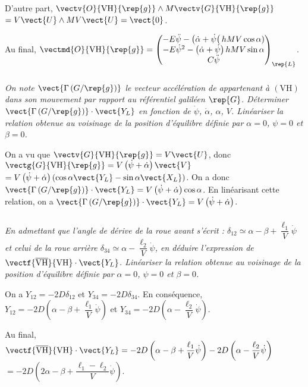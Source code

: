 \begin{multicols}{2}
\begin{corrige}
  D'autre part, $\vectv{O}{\text{VH}}{\rep{g}} \wedge M\vectv{G}{\text{VH}}{\rep{g}}$ $=V\vect{U}\wedge MV\vect{U} = \vect{0}$.
  
  Au final, $\vectmd{O}{\text{VH}}{\rep{g}} = \begin{pmatrix} 
  -E\ddot{\psi} - \left(\dot{\alpha} + \dot{\psi}\right( hMV\cos\alpha)\\ 
  -E\dot{\psi}^2 -\left(\dot{\alpha} +\dot{\psi}\right)  hMV \sin\alpha\\ 
  C\ddot{\psi} \end{pmatrix}_{\rep{L}} 
  $.

\end{corrige}
\else
\fi
\subparagraph{}\textit{On note $\vect{\Gamma\left(G/\rep{g} \right)}$ le vecteur accélération de appartenant à $(\text{VH})$
dans son mouvement par rapport au référentiel galiléen $\rep{G}$. Déterminer $\vect{\Gamma\left(G/\rep{g} \right)}\cdot \vect{Y_L}$
en fonction de $\dot{\psi}$, $\dot{\alpha}$, $\alpha$, $V$. Linéariser la relation obtenue au voisinage
de la position d'équilibre définie par $\alpha=0$, $\psi=0$ et $\beta=0$.}
\ifprof
\begin{corrige}
On a vu que $\vectv{G}{\text{VH}}{\rep{g}} = V\vect{U}$, donc  $\vectg{G}{\text{VH}}{\rep{g}} = V\left(\dot{\psi}+\dot{\alpha} \right)\vect{V}$
$= V\left(\dot{\psi}+\dot{\alpha} \right)\left( \cos\alpha \vect{Y_L} - \sin\alpha \vect{X_L} \right)$. 
On a donc  $\vect{\Gamma\left(G/\rep{g} \right)}\cdot \vect{Y_L} = V\left(\dot{\psi}+\dot{\alpha} \right) \cos\alpha  $.
En linéarisant cette relation, on a  $\vect{\Gamma\left(G/\rep{g} \right)}\cdot \vect{Y_L} = V\left(\dot{\psi}+\dot{\alpha} \right)$.

\end{corrige}
\else
\fi


\subparagraph{}\textit{En admettant que l’angle de dérive de la roue avant s’écrit : $\delta_{12}\simeq\alpha-\beta+\dfrac{\ell_1}{V}\dot{\psi}$ et celui de la roue arrière $\delta_{34}\simeq\alpha-\dfrac{\ell_2}{V}\dot{\psi}$, en déduire l’expression de $\vectf{\overline{\text{VH}}}{\text{VH}}\cdot \vect{Y_L}$. Linéariser la relation obtenue au voisinage
de la position d'équilibre définie par $\alpha=0$, $\psi=0$ et $\beta=0$.}
\ifprof
\begin{corrige}
On a $Y_{12}=-2D\delta_{12}$ et $Y_{34}=-2D\delta_{34}$. En conséquence, 
$Y_{12}=-2D\left( \alpha-\beta+\dfrac{\ell_1}{V}\dot{\psi} \right)$ et $Y_{34}=-2D \left(  \alpha-\dfrac{\ell_2}{V}\dot{\psi}\right)$.

Au final, $\vectf{\overline{\text{VH}}}{\text{VH}}\cdot \vect{Y_L} =-2D\left( \alpha-\beta+\dfrac{\ell_1}{V}\dot{\psi} \right) -2D \left(  \alpha-\dfrac{\ell_2}{V}\dot{\psi}\right)$ $=-2D\left( 2\alpha-\beta+\dfrac{\ell_1-\ell_2}{V}\dot{\psi} \right)$.



\end{corrige}
\end{multicols}
